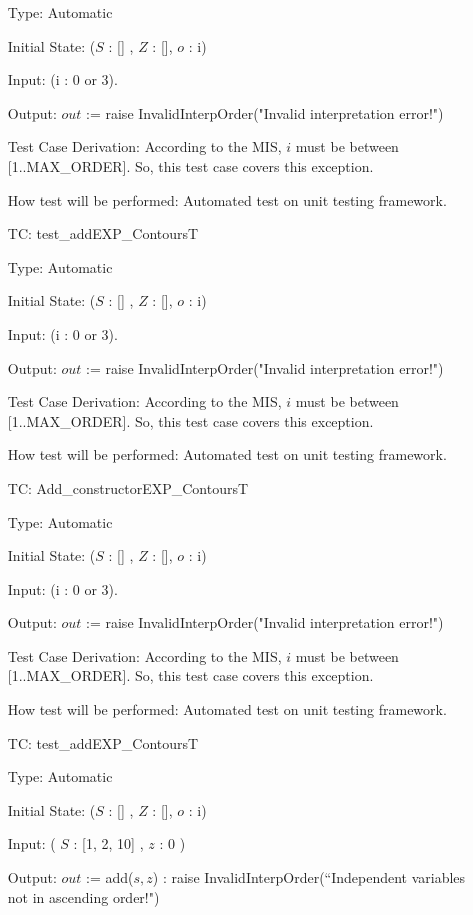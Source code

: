 \documentclass[12pt]{article}
\newcounter{utestnum} %
\begin{document}
\begin{enumerate}[label=TC\arabic*:,ref={\arabic*}]
Type: Automatic

Initial State: ($S$ : [] , $Z$ : [], $o$ : i)

Input: (i : 0 or 3).

Output: $out$ := raise InvalidInterpOrder("Invalid interpretation error!")


Test Case Derivation: According to the MIS, $i$ must be between [1..\mbox{MAX\_ORDER}]. So, this test case covers this exception.

How test will be performed: Automated test on unit testing framework.

\item [TC\refstepcounter{utestnum}\theutestnum: \label{addEXPContoursTest}] 
test\_addEXP\_ContoursT

Type: Automatic

Initial State: ($S$ : [] , $Z$ : [], $o$ : i)

Input: (i : 0 or 3).

Output: $out$ := raise InvalidInterpOrder("Invalid interpretation error!")


Test Case Derivation: According to the MIS, $i$ must be between [1..\mbox{MAX\_ORDER}]. So, this test case covers this exception.

How test will be performed: Automated test on unit testing framework.

\item [TC\refstepcounter{utestnum}\theutestnum: \label{AddEXPContoursTest}] 
Add\_constructorEXP\_ContoursT

Type: Automatic

Initial State: ($S$ : [] , $Z$ : [], $o$ : i)

Input: (i : 0 or 3).

Output: $out$ := raise InvalidInterpOrder("Invalid interpretation error!")


Test Case Derivation: According to the MIS, $i$ must be between [1..\mbox{MAX\_ORDER}]. So, this test case covers this exception.

How test will be performed: Automated test on unit testing framework.

\item [TC\refstepcounter{utestnum}\theutestnum: \label{addEXPContoursTest}] 
test\_addEXP\_ContoursT

Type: Automatic

Initial State: ($S$ : [] , $Z$ : [], $o$ : i)

Input: ( $S$ : [1, 2, 10] , $z$ : 0 )

Output: $out$ := add($s, z$) : raise InvalidInterpOrder(``Independent variables not in ascending order!")



\end{enumerate}
\end{document}
